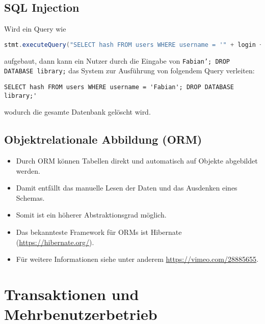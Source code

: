 \documentclass[a4paper, 11pt, accentcolor = tud3b]{tudreport}
\providecommand{\HREF}[1]{\href{#1}{#1}}
\begin{document}
        \section{SQL Injection} %
			Wird ein Query wie
			\begin{lstlisting}[language = Java]
stmt.executeQuery("SELECT hash FROM users WHERE username = '" + login + "'");
			\end{lstlisting}
			aufgebaut, dann kann ein Nutzer durch die Eingabe von \texttt{Fabian'; DROP DATABASE library;} das System zur Ausführung von folgendem Query verleiten:
			\begin{lstlisting}
SELECT hash FROM users WHERE username = 'Fabian'; DROP DATABASE library;'
			\end{lstlisting}
			wodurch die gesamte Datenbank gelöscht wird.

        \section{Objektrelationale Abbildung (ORM)} %
            \begin{itemize}
            	\item Durch ORM können Tabellen direkt und automatisch auf Objekte abgebildet werden.
            	\item Damit entfällt das manuelle Lesen der Daten und das Ausdenken eines Schemas.
            	\item Somit ist ein höherer Abstraktionsgrad möglich.
            	\item Das bekannteste Framework für ORMs ist Hibernate (\HREF{https://hibernate.org/}).
            	\item Für weitere Informationen siehe unter anderem \HREF{https://vimeo.com/28885655}.
            \end{itemize}

    \chapter{Transaktionen und Mehrbenutzerbetrieb} %
	    \label{c:transactions}
\end{document}
